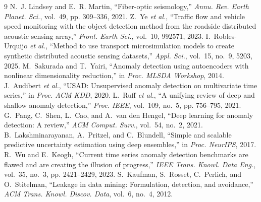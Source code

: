 \documentclass[10pt,a4paper,twocolumn]{article}
\begin{document}
\footnotesize
\begin{thebibliography}{9}\setlength{\itemsep}{0pt}
 N.~J. Lindsey and E.~R. Martin, ``Fiber-optic seismology,'' \emph{Annu. Rev. Earth Planet. Sci.}, vol.~49, pp. 309--336, 2021.
 Z.~Ye \emph{et al.}, ``Traffic flow and vehicle speed monitoring with the object detection method from the roadside distributed acoustic sensing array,'' \emph{Front. Earth Sci.}, vol.~10, 992571, 2023.
 I.~Robles-Urquijo \emph{et al.}, ``Method to use transport microsimulation models to create synthetic distributed acoustic sensing datasets,'' \emph{Appl. Sci.}, vol.~15, no.~9, 5203, 2025.
 M.~Sakurada and T.~Yairi, ``Anomaly detection using autoencoders with nonlinear dimensionality reduction,'' in \emph{Proc. MLSDA Workshop}, 2014.
 J.~Audibert \emph{et al.}, ``USAD: Unsupervised anomaly detection on multivariate time series,'' in \emph{Proc. ACM KDD}, 2020.
 L.~Ruff \emph{et al.}, ``A unifying review of deep and shallow anomaly detection,'' \emph{Proc. IEEE}, vol.~109, no.~5, pp. 756--795, 2021.
 G.~Pang, C.~Shen, L.~Cao, and A.~van den Hengel, ``Deep learning for anomaly detection: A review,'' \emph{ACM Comput. Surv.}, vol.~54, no.~2, 2021.
 B.~Lakshminarayanan, A.~Pritzel, and C.~Blundell, ``Simple and scalable predictive uncertainty estimation using deep ensembles,'' in \emph{Proc. NeurIPS}, 2017.
 R.~Wu and E.~Keogh, ``Current time series anomaly detection benchmarks are flawed and are creating the illusion of progress,'' \emph{IEEE Trans. Knowl. Data Eng.}, vol.~35, no.~3, pp. 2421--2429, 2023.
 S.~Kaufman, S.~Rosset, C.~Perlich, and O.~Stitelman, ``Leakage in data mining: Formulation, detection, and avoidance,'' \emph{ACM Trans. Knowl. Discov. Data}, vol.~6, no.~4, 2012.
\end{thebibliography}
\end{document}
